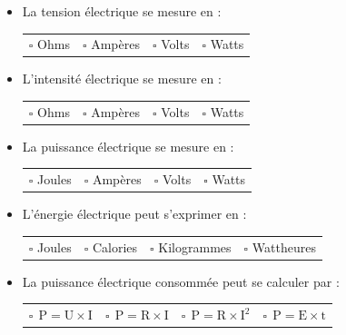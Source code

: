 \documentclass[11pt,a4paper]{article}
\begin{document}
\begin{itemize}
    \item La tension électrique se mesure en : \\
    \vspace{-5mm} 
        \begin{center}
    \begin{tabular}{C{3cm} C{3cm} C{3cm} C{3cm}}
         $\square$ Ohms & $\square$ Ampères & $\square$ Volts & $\square$ Watts \\
    \end{tabular}
\end{center}

\item L’intensité électrique se mesure en  :\\
\vspace{-5mm} 
        \begin{center}
    \begin{tabular}{C{3cm} C{3cm} C{3cm} C{3cm}}
         $\square$ Ohms & $\square$ Ampères & $\square$ Volts & $\square$ Watts \\
    \end{tabular}
\end{center}


\item La puissance électrique se mesure en : \\
\vspace{-5mm} 
\begin{center}
    \begin{tabular}{C{3cm} C{3cm} C{3cm} C{3cm}}
         $\square$ Joules & $\square$ Ampères & $\square$ Volts & $\square$ Watts \\
    \end{tabular}
\end{center}

\item L’énergie électrique peut s’exprimer en :
\vspace{-5mm} 
\begin{center}
    \begin{tabular}{C{3cm} C{3cm} C{3cm} C{3cm}}
         $\square$ Joules & $\square$ Calories & $\square$ Kilogrammes & $\square$ Wattheures \\
    \end{tabular}
\end{center}

\item La puissance électrique consommée peut se calculer par : 
\vspace{-5mm} 
\begin{center}
    \begin{tabular}{C{3cm} C{3cm} C{3cm} C{3cm}}
         $\square ~~\mathrm{P=U\times I} $  & $\square~~ \mathrm{P = R\times I }$ & $\square ~~\mathrm{P = R\times I^2 } $ & $\square ~~\mathrm{P=E\times t}$\\
    \end{tabular}
\end{center}


\end{itemize}
\end{document}
